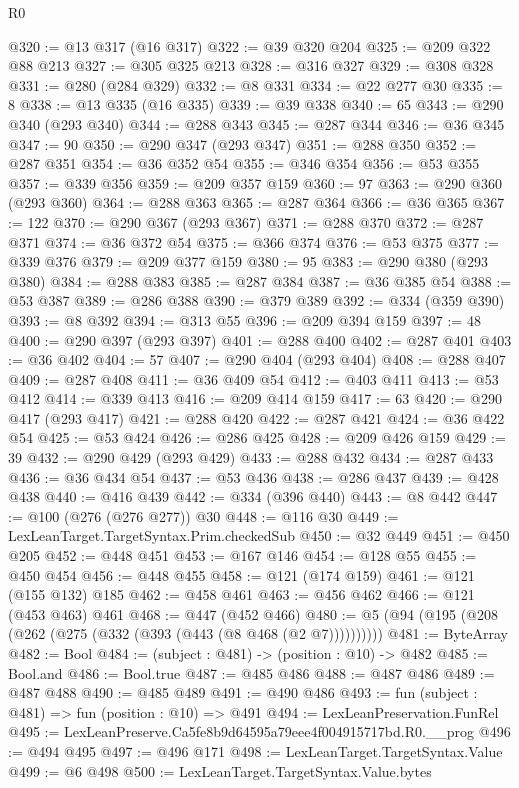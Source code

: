 \begin{lexlean}{R0}
\begin{coremodule}
@320 := @13 @317 (@16 @317)
@322 := @39 @320 @204
@325 := @209 @322 @88 @213
@327 := @305 @325 @213
@328 := @316 @327
@329 := @308 @328
@331 := @280 (@284 @329)
@332 := @8 @331
@334 := @22 @277 @30
@335 := 8
@338 := @13 @335 (@16 @335)
@339 := @39 @338
@340 := 65
@343 := @290 @340 (@293 @340)
@344 := @288 @343
@345 := @287 @344
@346 := @36 @345
@347 := 90
@350 := @290 @347 (@293 @347)
@351 := @288 @350
@352 := @287 @351
@354 := @36 @352 @54
@355 := @346 @354
@356 := @53 @355
@357 := @339 @356
@359 := @209 @357 @159
@360 := 97
@363 := @290 @360 (@293 @360)
@364 := @288 @363
@365 := @287 @364
@366 := @36 @365
@367 := 122
@370 := @290 @367 (@293 @367)
@371 := @288 @370
@372 := @287 @371
@374 := @36 @372 @54
@375 := @366 @374
@376 := @53 @375
@377 := @339 @376
@379 := @209 @377 @159
@380 := 95
@383 := @290 @380 (@293 @380)
@384 := @288 @383
@385 := @287 @384
@387 := @36 @385 @54
@388 := @53 @387
@389 := @286 @388
@390 := @379 @389
@392 := @334 (@359 @390)
@393 := @8 @392
@394 := @313 @55
@396 := @209 @394 @159
@397 := 48
@400 := @290 @397 (@293 @397)
@401 := @288 @400
@402 := @287 @401
@403 := @36 @402
@404 := 57
@407 := @290 @404 (@293 @404)
@408 := @288 @407
@409 := @287 @408
@411 := @36 @409 @54
@412 := @403 @411
@413 := @53 @412
@414 := @339 @413
@416 := @209 @414 @159
@417 := 63
@420 := @290 @417 (@293 @417)
@421 := @288 @420
@422 := @287 @421
@424 := @36 @422 @54
@425 := @53 @424
@426 := @286 @425
@428 := @209 @426 @159
@429 := 39
@432 := @290 @429 (@293 @429)
@433 := @288 @432
@434 := @287 @433
@436 := @36 @434 @54
@437 := @53 @436
@438 := @286 @437
@439 := @428 @438
@440 := @416 @439
@442 := @334 (@396 @440)
@443 := @8 @442
@447 := @100 (@276 (@276 @277)) @30
@448 := @116 @30
@449 := LexLeanTarget.TargetSyntax.Prim.checkedSub
@450 := @32 @449
@451 := @450 @205
@452 := @448 @451
@453 := @167 @146
@454 := @128 @55
@455 := @450 @454
@456 := @448 @455
@458 := @121 (@174 @159)
@461 := @121 (@155 @132) @185
@462 := @458 @461
@463 := @456 @462
@466 := @121 (@453 @463) @461
@468 := @447 (@452 @466)
@480 := @5 (@94 (@195 (@208 (@262 (@275 (@332 (@393 (@443 (@8 @468 (@2 @7))))))))))
@481 := ByteArray
@482 := Bool
@484 := (subject : @481) -> (position : @10) -> @482
@485 := Bool.and
@486 := Bool.true
@487 := @485 @486
@488 := @487 @486
@489 := @487 @488
@490 := @485 @489
@491 := @490 @486
@493 := fun (subject : @481) => fun (position : @10) => @491
@494 := LexLeanPreservation.FunRel
@495 := LexLeanPreserve.Ca5fe8b9d64595a79eee4f004915717bd.R0.__prog
@496 := @494 @495
@497 := @496 @171
@498 := LexLeanTarget.TargetSyntax.Value
@499 := @6 @498
@500 := LexLeanTarget.TargetSyntax.Value.bytes

\end{coremodule}
\end{lexlean}
